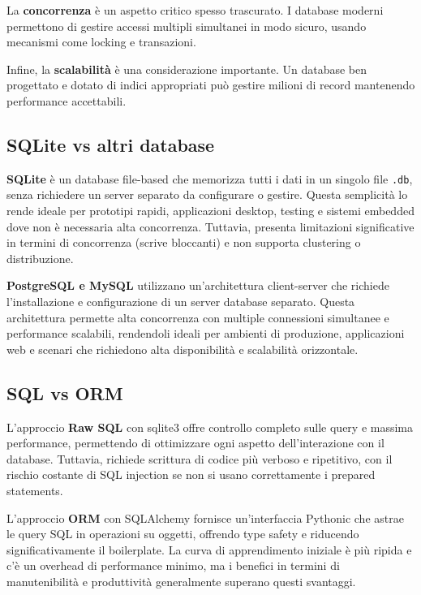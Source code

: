 La \textbf{concorrenza} è un aspetto critico spesso trascurato. I database moderni permettono di gestire accessi multipli simultanei in modo sicuro, usando mecanismi come locking e transazioni.

Infine, la \textbf{scalabilità} è una considerazione importante. Un database ben progettato e dotato di indici appropriati può gestire milioni di record mantenendo performance accettabili.

\subsection{SQLite vs altri database}

\textbf{SQLite} è un database file-based che memorizza tutti i dati in un singolo file \texttt{.db}, senza richiedere un server separato da configurare o gestire. Questa semplicità lo rende ideale per prototipi rapidi, applicazioni desktop, testing e sistemi embedded dove non è necessaria alta concorrenza. Tuttavia, presenta limitazioni significative in termini di concorrenza (scrive bloccanti) e non supporta clustering o distribuzione.

\textbf{PostgreSQL e MySQL} utilizzano un'architettura client-server che richiede l'installazione e configurazione di un server database separato. Questa architettura permette alta concorrenza con multiple connessioni simultanee e performance scalabili, rendendoli ideali per ambienti di produzione, applicazioni web e scenari che richiedono alta disponibilità e scalabilità orizzontale.

\subsection{SQL vs ORM}

L'approccio \textbf{Raw SQL} con sqlite3 offre controllo completo sulle query e massima performance, permettendo di ottimizzare ogni aspetto dell'interazione con il database. Tuttavia, richiede scrittura di codice più verboso e ripetitivo, con il rischio costante di SQL injection se non si usano correttamente i prepared statements.

L'approccio \textbf{ORM} con SQLAlchemy fornisce un'interfaccia Pythonic che astrae le query SQL in operazioni su oggetti, offrendo type safety e riducendo significativamente il boilerplate. La curva di apprendimento iniziale è più ripida e c'è un overhead di performance minimo, ma i benefici in termini di manutenibilità e produttività generalmente superano questi svantaggi.

